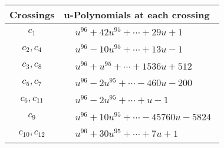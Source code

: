\documentclass[1p]{elsarticle_modified}
\theoremstyle{definition}
\begin{document}
\begin{tabular}{m{50pt}|m{274pt}}
Crossings & \hspace{64pt}u-Polynomials at each crossing \\
\hline $$\begin{aligned}c_{1}\end{aligned}$$&$\begin{aligned}
&u^{96}+42 u^{95}+\cdots+29 u+1
\end{aligned}$\\
\hline $$\begin{aligned}c_{2},c_{4}\end{aligned}$$&$\begin{aligned}
&u^{96}-10 u^{95}+\cdots+13 u-1
\end{aligned}$\\
\hline $$\begin{aligned}c_{3},c_{8}\end{aligned}$$&$\begin{aligned}
&u^{96}+u^{95}+\cdots+1536 u+512
\end{aligned}$\\
\hline $$\begin{aligned}c_{5},c_{7}\end{aligned}$$&$\begin{aligned}
&u^{96}-2 u^{95}+\cdots-460 u-200
\end{aligned}$\\
\hline $$\begin{aligned}c_{6},c_{11}\end{aligned}$$&$\begin{aligned}
&u^{96}-2 u^{95}+\cdots+u-1
\end{aligned}$\\
\hline $$\begin{aligned}c_{9}\end{aligned}$$&$\begin{aligned}
&u^{96}+10 u^{95}+\cdots-45760 u-5824
\end{aligned}$\\
\hline $$\begin{aligned}c_{10},c_{12}\end{aligned}$$&$\begin{aligned}
&u^{96}+30 u^{95}+\cdots+7 u+1
\end{aligned}$\\
\hline
\end{tabular}\\~\\
\newpage\renewcommand{\arraystretch}{1}
\end{document}
